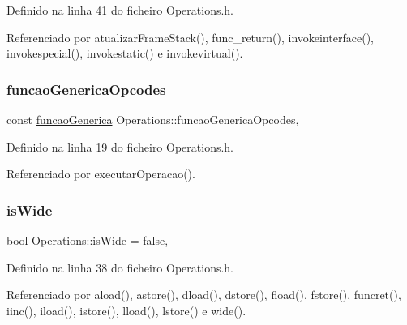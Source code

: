 Definido na linha 41 do ficheiro Operations.\+h.



Referenciado por atualizar\+Frame\+Stack(), func\+\_\+return(), invokeinterface(), invokespecial(), invokestatic() e invokevirtual().

\mbox{\label{classOperations_a7cb32c09e40f348cabf0b7af374ad278}} 
\subsubsection{\texorpdfstring{funcao\+Generica\+Opcodes}{funcaoGenericaOpcodes}}
{\footnotesize\ttfamily const \hyperlink{Operations_8h_a41b02f2392b85fc1d04e0d8e11c43398}{funcao\+Generica} Operations\+::funcao\+Generica\+Opcodes\hspace{0.3cm}{\ttfamily [static]}, {\ttfamily [private]}}



Definido na linha 19 do ficheiro Operations.\+h.



Referenciado por executar\+Operacao().

\mbox{\label{classOperations_a672ba6cc2178cbc5b0a434b08de4c608}} 
\subsubsection{\texorpdfstring{is\+Wide}{isWide}}
{\footnotesize\ttfamily bool Operations\+::is\+Wide = false\hspace{0.3cm}{\ttfamily [static]}, {\ttfamily [private]}}



Definido na linha 38 do ficheiro Operations.\+h.



Referenciado por aload(), astore(), dload(), dstore(), fload(), fstore(), funcret(), iinc(), iload(), istore(), lload(), lstore() e wide().

\mbox{\label{classOperations_af0867c8994e496c70f9c3157eeb8a287}} 
